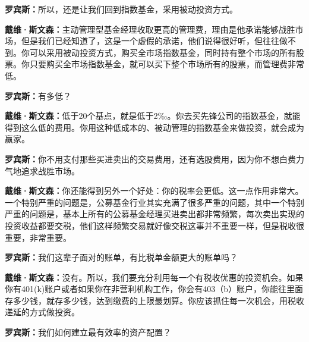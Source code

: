 \begin{BookQuote}
\textbf{罗宾斯：}所以，还是让我们回到指数基金，采用被动投资方式。
\end{BookQuote}

\begin{BookQuote}
\textbf{戴维·斯文森：}主动管理型基金经理收取更高的管理费，理由是他承诺能够战胜市场，但是我们已经知道了，这是一个虚假的承诺，他们说得很好听，但往往做不到。你可以采用被动投资方式，购买全市场指数基金，同时持有整个市场的所有股票。你只要购买全市场指数基金，就可以买下整个市场所有的股票，而管理费非常低。
\end{BookQuote}

\begin{BookQuote}
\textbf{罗宾斯：}有多低？
\end{BookQuote}

\begin{BookQuote}
\textbf{戴维·斯文森：}低于20个基点，就是低于2‰。你去买先锋公司的指数基金，就能得到这么低的费用。你用这种低成本的、被动管理的指数基金来做投资，就会成为赢家。
\end{BookQuote}

\begin{BookQuote}
\textbf{罗宾斯：}你不用支付那些买进卖出的交易费用，还有选股费用，因为你不想白费力气地追求战胜市场。
\end{BookQuote}

\begin{BookQuote}
\textbf{戴维·斯文森：}你还能得到另外一个好处：你的税率会更低。这一点作用非常大。一个特别严重的问题是，公募基金行业其实充满了很多严重的问题，其中一个特别严重的问题是，基本上所有的公募基金经理买进卖出都非常频繁，每次卖出实现的投资收益都要交税，他们这样频繁交易就好像交税这事并不重要一样，但是税收很重要，非常重要。
\end{BookQuote}

\begin{BookQuote}
\textbf{罗宾斯：}我们这辈子面对的账单，有比税单金额更大的账单吗？
\end{BookQuote}

\begin{BookQuote}
\textbf{戴维·斯文森：}没有。所以，我们要充分利用每一个有税收优惠的投资机会。如果你有401(k)账户或者如果你在非营利机构工作，你会有403（b）账户，你能往里面存多少钱，就存多少钱，达到缴费的上限最划算。你应该抓住每一次机会，用税收递延的方式做投资。
\end{BookQuote}

\begin{BookQuote}
\textbf{罗宾斯：}我们如何建立最有效率的资产配置？
\end{BookQuote}

